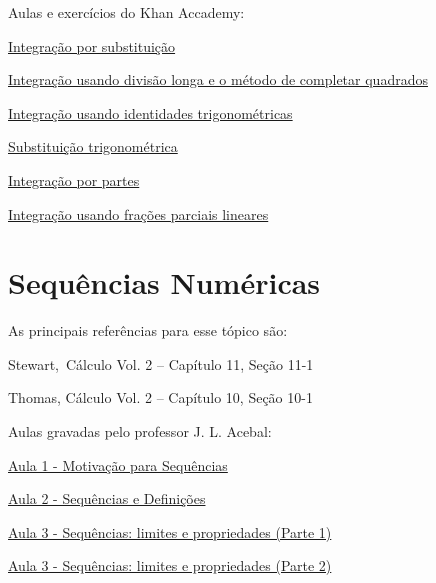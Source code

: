 Aulas e exercícios do Khan Accademy:
\begin{listlinks}
  \item \href{https://pt.khanacademy.org/math/integral-calculus/ic-integration/ic-u-sub/v/u-substitution}{Integração por substituição}
  \item \href{https://pt.khanacademy.org/math/integral-calculus/ic-integration/ic-long-div/v/integral-partial-fraction}{Integração usando divisão longa e o método de completar quadrados}
  \item \href{https://pt.khanacademy.org/math/integral-calculus/ic-integration/ic-integration-with-trig-identities/v/using-trig-identity-to-use-u-substitution}{Integração usando identidades trigonométricas}
  \item \href{https://pt.khanacademy.org/math/integral-calculus/ic-integration/ic-trig-substitution/v/introduction-to-trigonometric-substitution}{Substituição trigonométrica}
  \item \href{https://pt.khanacademy.org/math/integral-calculus/ic-integration/ic-integration-by-parts/v/deriving-integration-by-parts-formula}{Integração por partes}
  \item \href{https://pt.khanacademy.org/math/integral-calculus/ic-integration/ic-partial-frac/v/integration-with-partial-fractions}{Integração usando frações parciais lineares}
\end{listlinks}

\section{Sequências Numéricas}

As principais referências para esse tópico são:
\begin{listrefs}
  \item Stewart,\, Cálculo Vol. 2 \cite{stewart_2} -- Capítulo 11, Seção 11-1
  \item Thomas,    Cálculo Vol. 2 \cite{thomas_2}  -- Capítulo 10, Seção 10-1
\end{listrefs}

Aulas gravadas pelo professor J. L. Acebal:
\begin{listlinks}
  \item \href{https://youtu.be/7A1s_n1Tpmk}{Aula 1 - Motivação para Sequências}
  \item \href{https://youtu.be/9OPgOfeZW0o}{Aula 2 - Sequências e Definições}
  \item \href{https://youtu.be/MqU6PqxAOHc}{Aula 3 - Sequências: limites e propriedades (Parte 1)}
  \item \href{https://youtu.be/GddAFc4l7CI}{Aula 3 - Sequências: limites e propriedades (Parte 2)}
\end{listlinks}

